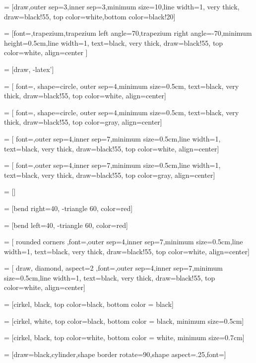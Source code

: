 \usetikzlibrary{positioning}

\usetikzlibrary{shadows}

\usetikzlibrary{shapes,arrows}

 = [draw,outer sep=3,inner sep=3,minimum size=10,line width=1, very thick, draw=black!55, top color=white,bottom color=black!20]

\usetikzlibrary{arrows}


 = [font={\bfseries},trapezium,trapezium left angle=70,trapezium right angle=-70,minimum height=0.5cm,line width=1, text=black, very thick, draw=black!55, top color=white, align=center ]

 = [draw, -latex']

 = [ font={\bfseries}, shape=circle, outer sep=4,minimum size=0.5cm, text=black, very thick, draw=black!55, top color=white, align=center]

 = [ font={\bfseries}, shape=circle, outer sep=4,minimum size=0.5cm, text=black, very thick, draw=black!55, top color=gray, align=center]

 = [ font={\bfseries},outer sep=4,inner sep=7,minimum size=0.5cm,line width=1, text=black, very thick, draw=black!55, top color=white, align=center]

 = [ font={\bfseries},outer sep=4,inner sep=7,minimum size=0.5cm,line width=1, text=black, very thick, draw=black!55, top color=gray, align=center]

 = []

 = [bend right=40, -triangle 60, color=red]

 = [bend left=40, -triangle 60, color=red]

 = [ rounded corners ,font={\bfseries},outer sep=4,inner sep=7,minimum size=0.5cm,line width=1, text=black, very thick, draw=black!55, top color=white, align=center]

 = [ draw, diamond, aspect=2 ,font={\bfseries},outer sep=4,inner sep=7,minimum size=0.5cm,line width=1, text=black, very thick, draw=black!55, top color=white, align=center]

 = [cirkel, black, top color=black, bottom color = black]

 = [cirkel, white, top color=black, bottom color = black, minimum size=0.5cm]

 = [cirkel, black, top color=white, bottom color = white, minimum size=0.7cm]

 = [draw=black,cylinder,shape border rotate=90,shape aspect=.25,font={\bfseries}]

